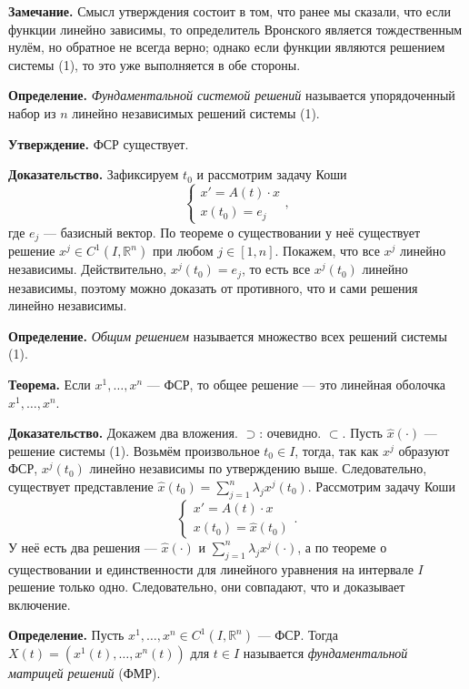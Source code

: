 \QED

\textbf{Замечание.} Смысл утверждения состоит в том, что ранее мы сказали, что если функции линейно зависимы, то определитель Вронского является тождественным нулём, но обратное не всегда верно; однако если функции являются решением системы (1), то это уже выполняется в обе стороны.

\textbf{Определение.} \textit{Фундаментальной системой решений} называется упорядоченный набор из $n$ линейно независимых решений системы (1).

\textbf{Утверждение.} ФСР существует.

\textbf{Доказательство.} Зафиксируем $t_0$ и рассмотрим задачу Коши
\[
    \begin{cases}
        x' = A(t) \cdot x \\
        x(t_0) = e_j
    \end{cases} ,
\]
где $e_j$ --- базисный вектор. По теореме о существовании у неё существует решение $x^j \in C^1(I, \mathbb R^n)$ при любом $j \in [1, n]$.
Покажем, что все $x^j$ линейно независимы. Действительно, $x^j(t_0) = e_j$, то есть все $x^j(t_0)$ линейно независимы, поэтому можно доказать от противного, что и сами решения линейно независимы.

\QED

\textbf{Определение.} \textit{Общим решением} называется множество всех решений системы (1).

\textbf{Теорема.} Если $x^1, \dots, x^n$ --- ФСР, то общее решение --- это линейная оболочка $x^1, \dots, x^n$.

\textbf{Доказательство.} Докажем два вложения. $\supset$: очевидно. $\subset$. Пусть $\widehat x(\cdot)$ --- решение системы (1). 
Возьмём произвольное $t_0 \in I$, тогда, так как $x^j$ образуют ФСР, $x^j(t_0)$ линейно независимы по утверждению выше.
Следовательно, существует представление $\widehat x(t_0) = \sum_{j=1}^{n} \lambda_jx^j(t_0)$.
Рассмотрим задачу Коши
\[
    \begin{cases}
        x' = A(t) \cdot x \\
        x(t_0) = \widehat x(t_0)
    \end{cases} .
\]
У неё есть два решения --- $\widehat x(\cdot)$ и $\sum_{j=1}^{n} \lambda_jx^j(\cdot)$, а по теореме о существовании и единственности для линейного уравнения на интервале $I$ решение только одно.
Следовательно, они совпадают, что и доказывает включение.

\QED

\textbf{Определение.} Пусть $x^1, \dots, x^n \in C^1(I, \mathbb R^n)$ --- ФСР.
Тогда $X(t) = (x^1(t), \dots, x^n(t))$ для $t \in I$ называется \textit{фундаментальной матрицей решений} (ФМР).

